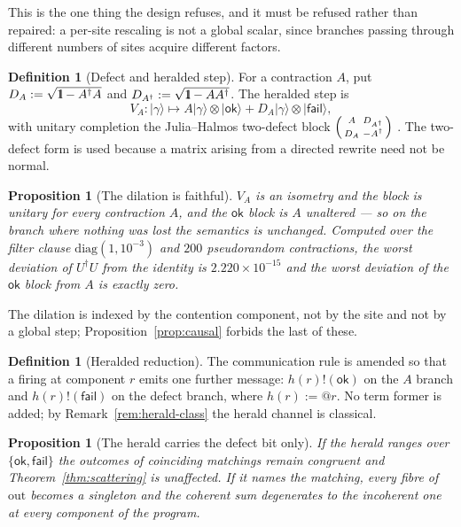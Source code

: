 \documentclass[11pt,a4paper]{article}
\newcommand{\Id}{\mathrm{1}\hspace{-0.30em}\mathrm{l}}
\theoremstyle{plain}
\newtheorem{proposition}[theorem]{Proposition}
\theoremstyle{definition}
\newtheorem{definition}[theorem]{Definition}
\theoremstyle{remark}
\newcommand{\Out}{\mathrm{out}}
\newcommand{\ket}[1]{\lvert #1 \rangle}
\begin{document}
This is the one thing the design refuses, and it must be refused rather than
repaired: a per-site rescaling is not a global scalar, since branches passing
through different numbers of sites acquire different factors.

\begin{definition}[Defect and heralded step]\label{def:heraldedstep}
For a contraction $A$, put $D_A := \sqrt{\Id - A^{\dagger}A}$ and
$D_{A^{\dagger}} := \sqrt{\Id - AA^{\dagger}}$. The heralded step is
\[
  V_A : \ket{\gamma} \longmapsto
    A\ket{\gamma}\otimes\ket{\mathsf{ok}}
    + D_A\ket{\gamma}\otimes\ket{\mathsf{fail}},
\]
with unitary completion the Julia--Halmos two-defect block
$\begin{psmallmatrix} A & D_{A^{\dagger}} \\ D_A & -A^{\dagger}\end{psmallmatrix}$
\cite{SzNagyFoias}. The two-defect form is used because a matrix arising from a
directed rewrite need not be normal.
\end{definition}

\begin{proposition}[The dilation is faithful]\label{prop:dilation}
$V_A$ is an isometry and the block is unitary for every contraction $A$, and the
$\mathsf{ok}$ block is $A$ unaltered --- so on the branch where nothing was lost
the semantics is unchanged. Computed over the filter clause
$\mathrm{diag}(1,10^{-3})$ and $200$ pseudorandom contractions, the worst
deviation of $U^{\dagger}U$ from the identity is $2.220\times10^{-15}$ and the
worst deviation of the $\mathsf{ok}$ block from $A$ is exactly zero.
\end{proposition}

The dilation is indexed by the contention component, not by the site and not by
a global step; Proposition~\ref{prop:causal} forbids the last of these.

\begin{definition}[Heralded reduction]\label{def:heraldedred}
The communication rule is amended so that a firing at component $r$ emits one
further message: $h(r)!(\mathsf{ok})$ on the $A$ branch and
$h(r)!(\mathsf{fail})$ on the defect branch, where $h(r) := @r$. No term former
is added; by Remark~\ref{rem:herald-class} the herald channel is classical.
\end{definition}

\begin{proposition}[The herald carries the defect bit only]\label{prop:defectbit}
If the herald ranges over $\{\mathsf{ok},\mathsf{fail}\}$ the outcomes of
coinciding matchings remain congruent and Theorem~\ref{thm:scattering} is
unaffected. If it names the matching, every fibre of $\Out$ becomes a singleton
and the coherent sum degenerates to the incoherent one at every component of the
program.
\end{proposition}
\end{document}
